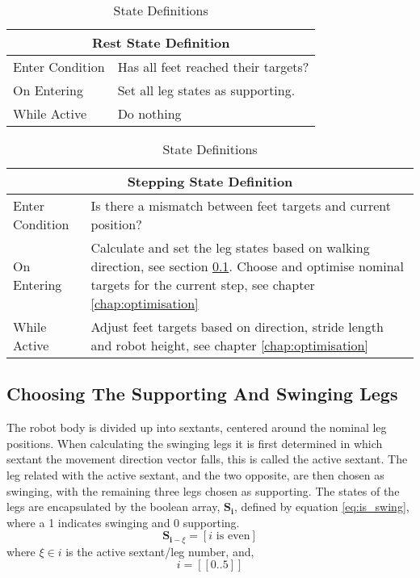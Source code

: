 \begin{table}[h]
    \center
    \begin{tabularx}{\textwidth}{|l|X|}
        \hline
        \multicolumn{2}{|c|}{Rest State Definition} \\
        \hline
        Enter Condition & Has all feet reached their targets? \\
        \hline
        On Entering & Set all leg states as supporting. \\
        \hline
        While Active & Do nothing \\
        \hline
    \end{tabularx}
    
    \bigskip
    \noindent
    \begin{tabularx}{\textwidth}{|l|X|}
        \hline
        \multicolumn{2}{|c|}{Stepping State Definition} \\
        \hline
        Enter Condition & Is there a mismatch between feet targets and current position? \\
        \hline
        On Entering & Calculate and set the leg states based on walking direction, see section \ref{sec:supp_swing_calc}. Choose and optimise nominal targets
        for the current step, see chapter \ref{chap:optimisation}\\
        \hline
        While Active & Adjust feet targets based on direction, stride length and robot height, see chapter \ref{chap:optimisation}\\
        \hline
    \end{tabularx}
    \caption{State Definitions}
    \label{tab:state_defs}
\end{table}

\newpage
\subsection{Choosing The Supporting And Swinging Legs} \label{sec:supp_swing_calc}
    The robot body is divided up into sextants, centered around the nominal leg positions. When calculating
    the swinging legs it is first determined in which sextant the movement direction vector falls, this is called the active sextant.
    The leg related with the active sextant, and the two opposite, are then chosen as swinging, with the remaining three legs chosen as supporting.
    The states of the legs are encapsulated by the boolean array, \(\bm{S_i}\), defined by equation \ref{eq:is_swing},
    where a 1 indicates swinging and 0 supporting.
    \begin{equation}\label{eq:is_swing}
        \bm{S}_{\bm{i} - \xi}=[i \text{ is even}]
    \end{equation}
    where \(\xi \in i\) is the active sextant/leg number, and,
    \[i = [\![0..5]\!]\]

